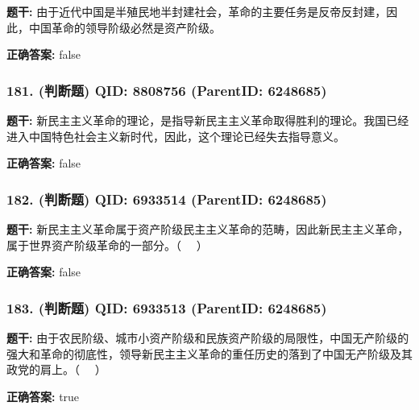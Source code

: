 \documentclass[12pt,UTF8]{ctexart}
\begin{document}
\textbf{题干:}
由于近代中国是半殖民地半封建社会，革命的主要任务是反帝反封建，因此，中国革命的领导阶级必然是资产阶级。



\textbf{正确答案:}
false

\vspace{0.3em}\hrulefill\vspace{0.7em}

\subsubsection*{181. (判断题) \small QID: 8808756 (ParentID: 6248685)}

\textbf{题干:}
新民主主义革命的理论，是指导新民主主义革命取得胜利的理论。我国已经进入中国特色社会主义新时代，因此，这个理论已经失去指导意义。



\textbf{正确答案:}
false

\vspace{0.3em}\hrulefill\vspace{0.7em}

\subsubsection*{182. (判断题) \small QID: 6933514 (ParentID: 6248685)}

\textbf{题干:}
新民主主义革命属于资产阶级民主主义革命的范畴，因此新民主主义革命，属于世界资产阶级革命的一部分。（   ）



\textbf{正确答案:}
false

\vspace{0.3em}\hrulefill\vspace{0.7em}

\subsubsection*{183. (判断题) \small QID: 6933513 (ParentID: 6248685)}

\textbf{题干:}
由于农民阶级、城市小资产阶级和民族资产阶级的局限性，中国无产阶级的强大和革命的彻底性，领导新民主主义革命的重任历史的落到了中国无产阶级及其政党的肩上。（   ）



\textbf{正确答案:}
true

\vspace{0.3em}\hrulefill\vspace{0.7em}
\end{document}
